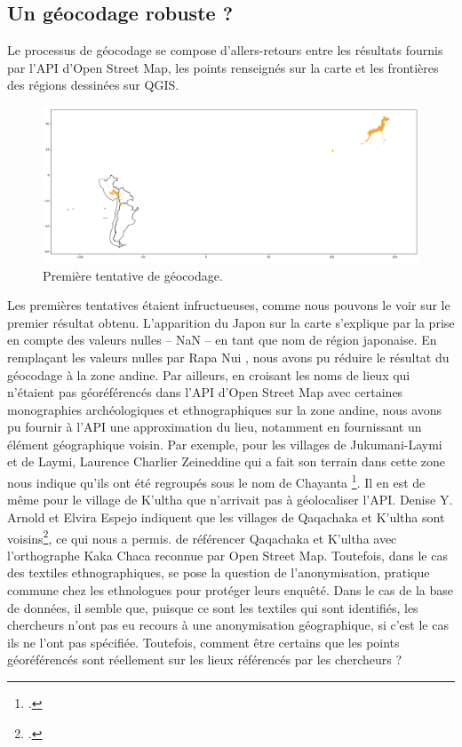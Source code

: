 \subsection{Un géocodage robuste ?}
Le processus de géocodage se compose d'allers-retours entre les résultats fournis par l'API d'Open Street Map, les points renseignés sur la carte et les frontières des régions dessinées sur QGIS.

 \begin{figure}[!h]
	\begin{center}
		\includegraphics[width=15cm]{../images/erreursGeocodage.png}
		\caption{Première tentative de géocodage.}
		\label{fig:erreurGeocod}
	 \end{center}
\end{figure}

Les premières tentatives étaient infructueuses, comme nous pouvons le voir sur le premier résultat obtenu. L'apparition du Japon sur la carte s'explique par la prise en compte des valeurs nulles -- NaN --  en tant que nom de région japonaise. En remplaçant les valeurs nulles par \og Rapa Nui \fg, nous avons pu réduire le résultat du géocodage à la zone andine. Par ailleurs, en croisant les noms de lieux qui n'étaient pas géoréférencés dans l'API d'Open Street Map avec certaines monographies archéologiques et ethnographiques sur la zone andine, nous avons pu fournir à l'API une approximation du lieu, notamment en fournissant un élément géographique voisin. Par exemple, pour les villages de Jukumani-Laymi et de Laymi, Laurence Charlier Zeineddine qui a fait son terrain dans cette zone nous indique qu'ils ont été regroupés sous le nom de \og Chayanta \fg\footcite[par.~12]{charlierzeineddineChapitreLikIchiri2015}. Il en est de même pour le village de K'ultha que n'arrivait pas à géolocaliser l'API. Denise Y. Arnold et Elvira Espejo indiquent que les villages de Qaqachaka et K'ultha sont voisins\footcite[p.~304]{arnoldWovenTechniquesSocial2014}, ce qui nous a permis. de référencer Qaqachaka et K'ultha avec l'orthographe \og Kaka Chaca \fg \:reconnue par Open Street Map. Toutefois, dans le cas des textiles ethnographiques, se pose la question de l'anonymisation, pratique commune chez les ethnologues pour protéger leurs enquêté. Dans le cas de la base de données, il semble que, puisque ce sont les textiles qui sont identifiés, les chercheurs n'ont pas eu recours à une anonymisation géographique, si c'est le cas ils ne l'ont pas spécifiée.
Toutefois, comment être certains que les points géoréférencés sont réellement sur les lieux référencés par les chercheurs ? \\

